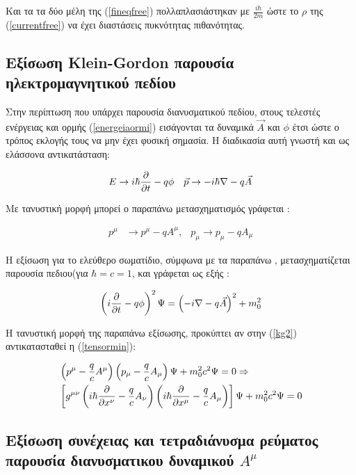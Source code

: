  Kαι τα τα δύο μέλη της (\ref{fineqfree}) πολλαπλασιάστηκαν με $\frac{i \hbar}{2m}$ ώστε το $\rho$ της (\ref{currentfree}) να έχει διαστάσεις πυκνότητας πιθανότητας.
\subsection{Εξίσωση \textlatin{Klein-Gordon} παρουσία ηλεκτρομαγνητικού πεδίου}

Στην περίπτωση που υπάρχει παρουσία διανυσματικού πεδίου, στους τελεστές ενέργειας και ορμής (\ref{energeiaormi}) εισάγονται τα δυναμικά $\vec{A}$ και $\phi$ έτσι ώστε ο τρόπος εκλογής τους να μην έχει φυσική σημασία. Η διαδικασία αυτή γνωστή και ως ελάσσονα αντικατάσταση: 

\begin{align} 
  E & \rightarrow i\hbar \frac{\partial }{\partial t} -q\phi  &\vec{p} \rightarrow -i \hbar \nabla-q\vec{A}
  \label{energeiaormi2}
\end{align} 

Με τανυστική μορφή μπορεί ο παραπάνω μετασχηματισμός γράφεται : 

\begin{align}
  p^\mu & \rightarrow p^\mu-qA^\mu,    &p_\mu \rightarrow p_\mu-qA_\mu
  \label{tensormin}
\end{align}

Η εξίσωση για το ελεύθερο σωματίδιο, σύμφωνα με τα παραπάνω , μετασχηματίζεται παρουσία πεδιου(για $\hbar=c=1$, και γράφεται ως εξής : 

\[
\left(  i \frac{\partial }{\partial t}-q\phi \right)  ^2 \Psi = \left(  -i \nabla -q\vec{A} \right)  ^2 +m_0^2 
\label{kgfield} 
\]

Η τανυστική μορφή της παραπάνω εξίσωσης, προκύπτει αν στην (\ref{kg2}) αντικατασταθεί η (\ref{tensormin}): 

\begin{align}
  \notag &\left(  p^\mu-\frac{q}{c}A^\mu \right)  \left(  {p}_\mu-\frac{q}{c}A_\mu \right)  \Psi +m_0^2 c^2 \Psi = 0 \Rightarrow
  \\  &\left[  g^{\mu\nu} \left(  i \hbar\frac{\partial }{\partial x^\nu}-\frac{q}{c}A_\nu \right)  \left(  i \hbar\frac{\partial }{\partial x^\mu}-\frac{q}{c}A_\mu \right) \right]  \Psi+m_0^2 c^2 \Psi  =0 
  \label{eqn1}
\end{align}

\subsection{Εξίσωση συνέχειας και τετραδιάνυσμα ρεύματος παρουσία διανυσματικου δυναμικού $A^\mu$}  


